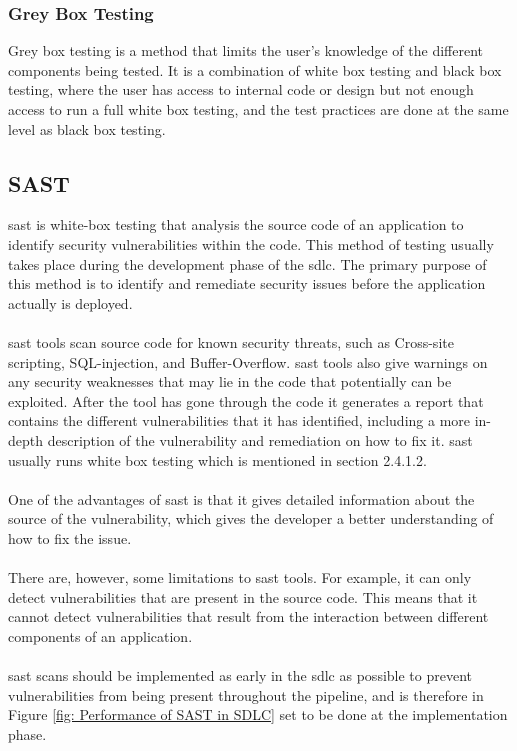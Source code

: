 \subsubsection{Grey Box Testing}
Grey box testing is a method that limits the user's knowledge of the different components being tested. It is a combination of white box testing and black box testing, where the user has access to internal code or design but not enough access to run a full white box testing, and the test practices are done at the same level as black box testing. \cite{GreyBox}


\subsection{SAST}
\acrlong{sast} is white-box testing that analysis the source code of an application to identify security vulnerabilities within the code. This method of testing usually takes place during the development phase of the \acrlong{sdlc}. The primary purpose of this method is to identify and remediate security issues before the application actually is deployed. \cite{sast}
\\~\\
\acrshort{sast} tools scan source code for known security threats, such as \gls{Cross-site scripting}, \gls{SQL-injection}, and \gls{Buffer-Overflow}. \acrshort{sast} tools also give warnings on any security weaknesses that may lie in the code that potentially can be exploited. After the tool has gone through the code it generates a report that contains the different vulnerabilities that it has identified, including a more in-depth description of the vulnerability and remediation on how to fix it. \acrshort{sast} usually runs white box testing  which is mentioned in section 2.4.1.2. 
\\~\\
One of the advantages of \acrshort{sast} is that it gives detailed information about the source of the vulnerability, which gives the developer a better understanding of how to fix the issue. 
\\~\\
There are, however, some limitations to \acrshort{sast} tools. For example, it can only detect vulnerabilities that are present in the source code. This means that it cannot detect vulnerabilities that result from the interaction between different components of an application.
\\~\\
\acrshort{sast} scans should be implemented as early in the \acrshort{sdlc} as possible to prevent vulnerabilities from being present throughout the pipeline, and is therefore in Figure \ref{fig: Performance of SAST in SDLC} set to be done at the implementation phase.  
